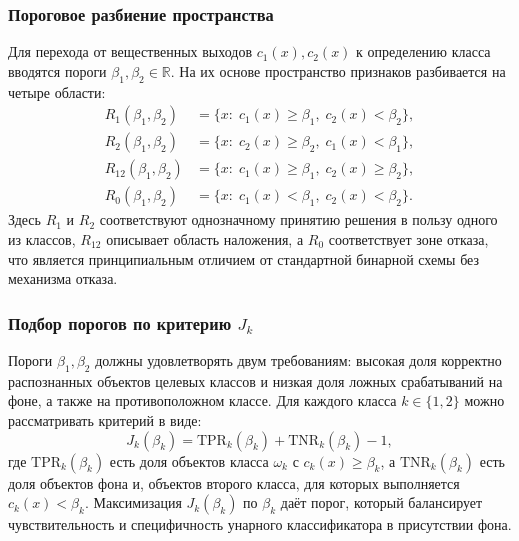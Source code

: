 \documentclass[12pt,a4paper]{article}
\begin{document}
\subsubsection{Пороговое разбиение пространства}
Для перехода от вещественных выходов $c_1(x),c_2(x)$ к определению класса вводятся пороги
$\beta_1,\beta_2\in\mathbb{R}$. На их основе пространство признаков разбивается на четыре области:
\begin{align}
R_1(\beta_1,\beta_2) &= \{x:\; c_1(x)\ge \beta_1,\; c_2(x)<\beta_2\},\\
R_2(\beta_1,\beta_2) &= \{x:\; c_2(x)\ge \beta_2,\; c_1(x)<\beta_1\},\\
R_{12}(\beta_1,\beta_2) &= \{x:\; c_1(x)\ge \beta_1,\; c_2(x)\ge \beta_2\},\\
R_{0}(\beta_1,\beta_2) &= \{x:\; c_1(x)< \beta_1,\; c_2(x)< \beta_2\}.
\end{align}
Здесь $R_1$ и $R_2$ соответствуют однозначному принятию решения в пользу одного из классов,
$R_{12}$ описывает область наложения,
а $R_0$ соответствует зоне отказа, что является принципиальным отличием
от стандартной бинарной схемы без механизма отказа.

\subsubsection{Подбор порогов по критерию $J_k$}
Пороги $\beta_1,\beta_2$ должны удовлетворять двум требованиям: высокая доля корректно распознанных
объектов целевых классов и низкая доля ложных срабатываний на фоне, а также
на противоположном классе. Для каждого класса $k\in\{1,2\}$ можно рассматривать критерий в виде:
\begin{equation}
J_k(\beta_k) = \mathrm{TPR}_k(\beta_k) + \mathrm{TNR}_k(\beta_k) - 1,
\end{equation}
где $\mathrm{TPR}_k(\beta_k)$ есть доля объектов класса $\omega_k$ с $c_k(x)\ge \beta_k$,
а $\mathrm{TNR}_k(\beta_k)$ есть доля объектов фона и, объектов второго класса,
для которых выполняется $c_k(x)<\beta_k$. Максимизация $J_k(\beta_k)$ по $\beta_k$ даёт
порог, который балансирует чувствительность и специфичность унарного классификатора
в присутствии фона.
\end{document}
